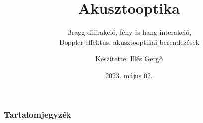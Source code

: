\documentclass[aspectratio=169]{beamer}
\begin{document}
\title{Akusztooptika}
\subtitle{Bragg-diffrakció, fény és hang interakció,\\Doppler-effektus, akusztooptikai berendezések}
\author{Készítette: Illés Gergő}
\date{2023. május 02.}
\begin{frame}
\maketitle
\end{frame}

\begin{frame}
\frametitle{Tartalomjegyzék}

\begin{columns}
\tableofcontents
\end{columns}
\end{frame}
\end{document}
